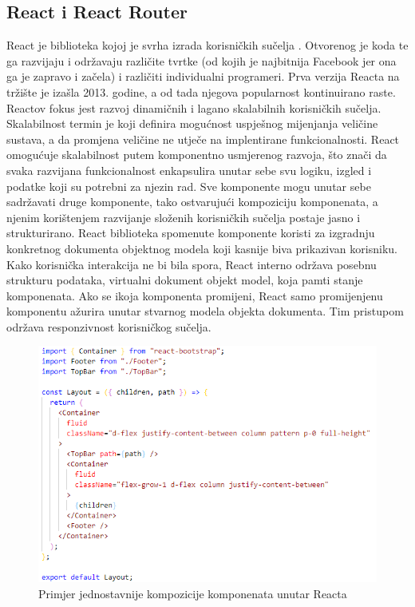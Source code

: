 \documentclass[times, utf8, zavrsni]{fer}
\begin{document}
			\subsection{React i React Router}
			React je biblioteka kojoj je svrha izrada korisničkih sučelja . Otvorenog je koda te ga razvijaju i održavaju različite tvrtke (od kojih je najbitnija Facebook jer ona ga je zapravo i začela) i različiti individualni programeri. Prva verzija Reacta na tržište je izašla 2013. godine, a od tada njegova popularnost kontinuirano raste. Reactov fokus jest razvoj dinamičnih i lagano skalabilnih korisničkih sučelja. Skalabilnost  termin je koji definira mogućnost uspješnog mijenjanja veličine sustava, a da promjena veličine ne utječe na implentirane funkcionalnosti. React omogućuje skalabilnost  putem komponentno usmjerenog razvoja, što znači da svaka razvijana funkcionalnost enkapsulira unutar sebe svu logiku, izgled i podatke koji su potrebni za njezin rad. Sve komponente mogu unutar sebe sadržavati druge komponente, tako ostvarujući kompoziciju  komponenata, a njenim korištenjem razvijanje složenih korisničkih sučelja postaje jasno i strukturirano. React biblioteka spomenute komponente koristi za izgradnju konkretnog dokumenta objektnog modela koji kasnije biva prikazivan korisniku. Kako korisnička interakcija ne bi bila spora, React interno održava posebnu strukturu podataka, virtualni dokument objekt model, koja pamti stanje komponenata. Ako se ikoja komponenta promijeni, React samo promijenjenu komponentu ažurira unutar stvarnog modela objekta dokumenta. Tim pristupom održava responzivnost korisničkog sučelja.\\
			\begin{figure}[H]
				\centering
				\includegraphics[scale=0.75]{pictures/prikazi/React.png}
				\caption{Primjer jednostavnije kompozicije komponenata unutar Reacta}
				\label{fig:react}
			\end{figure}
\end{document}
